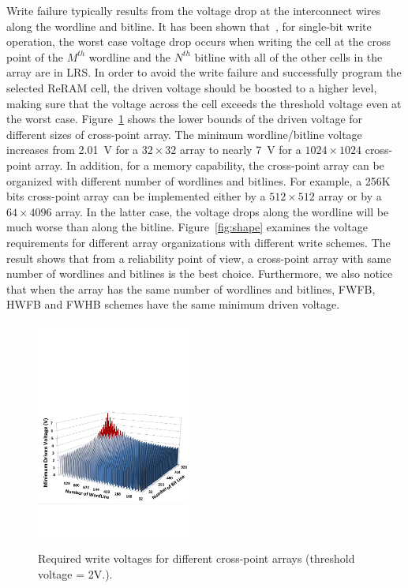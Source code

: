 Write failure typically results from the voltage drop at the interconnect
wires along the wordline and bitline. It has been shown
that~\cite{crossbar_TED_2010}, for single-bit write operation, the worst
case voltage drop occurs when writing the cell at the cross point of the
$M^{th}$ wordline and the $N^{th}$ bitline with all of the other cells in
the array are in LRS. In order to avoid the write failure and successfully
program the selected ReRAM cell, the driven voltage should be boosted to a
higher level, making sure that the voltage across the cell exceeds the
threshold voltage even at the worst case. Figure~\ref{fig:worst_v} shows
the lower bounds of the driven voltage for different sizes of cross-point
array. The minimum wordline/bitline voltage increases from 2.01~V for a
$32 \times 32$ array to nearly 7~V for a $1024 \times 1024$ cross-point
array. In addition, for a memory capability, the cross-point array can be
organized with different number of wordlines and bitlines. For example, a
256K bits cross-point array can be implemented either by a $512 \times
512$ array or by a $64 \times 4096$ array. In the latter case, the voltage
drops along the wordline will be much worse than along the bitline.
Figure~\ref{fig:shape} examines the voltage requirements for different
array organizations with different write schemes. The result shows that
from a reliability point of view, a cross-point array with same number of
wordlines and bitlines is the best choice. Furthermore, we also notice
that when the array has the same number of wordlines and bitlines, FWFB,
HWFB and FWHB schemes have the same minimum driven voltage.


\begin{figure}%
\centering
\hspace{-5pt}
  \includegraphics[width=0.45\textwidth]{./figures/worst_v_f.pdf}\\
  \caption{Required write voltages for different cross-point arrays (threshold voltage = 2V.). }\label{fig:worst_v}
  \vspace{-5pt}
\end{figure}



